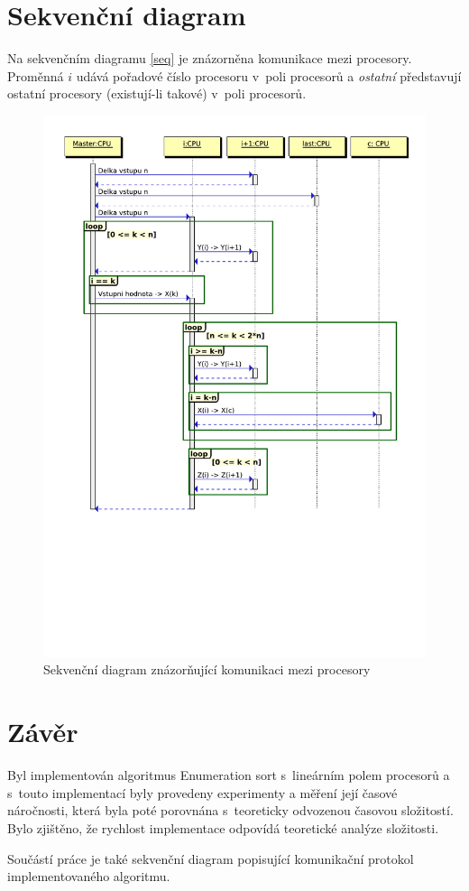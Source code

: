 \documentclass[a4paper, 12pt]{article}
\begin{document}
\section{Sekvenční diagram}
\label{sec:seq}
Na sekvenčním diagramu \ref{seq} je znázorněna komunikace mezi procesory.
Proměnná $i$ udává pořadové číslo procesoru v~poli procesorů a \emph{ostatní}
představují ostatní procesory (existují-li takové) v~poli procesorů.
\begin{figure}
\includegraphics[width=15cm,keepaspectratio]{seq.pdf}
\caption{Sekvenční diagram znázorňující komunikaci mezi procesory}
\end{figure}
\label{fig:seq}

\section{Závěr}
Byl implementován algoritmus Enumeration sort s~lineárním polem procesorů a s~touto implementací byly provedeny
experimenty a měření její časové náročnosti, která byla poté porovnána s~teoreticky odvozenou časovou složitostí.
Bylo zjištěno, že rychlost implementace odpovídá teoretické analýze složitosti.

Součástí práce je také sekvenční diagram popisující komunikační protokol implementovaného algoritmu.

\newpage


\end{document}
